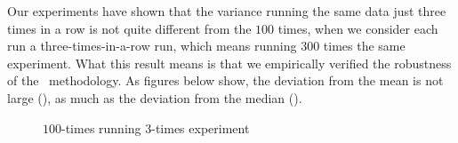 
Our experiments have shown that the variance running the same data just three times in a row is not quite different from the $100$ times, when we consider each run a three-times-in-a-row run, which means running $300$ times the same experiment. What this result means is that we empirically verified the robustness of the \CP\ methodology. As figures  below show, the deviation from the mean is not large (), as much as the deviation from the median ().

\begin{figure}
  \centering
  
  \begin{minipage}[t]{\linewidth}
  \end{minipage}
  \caption{$100$-times running $3$-times experiment}
  \label{fig:CProbust}
\end{figure}

